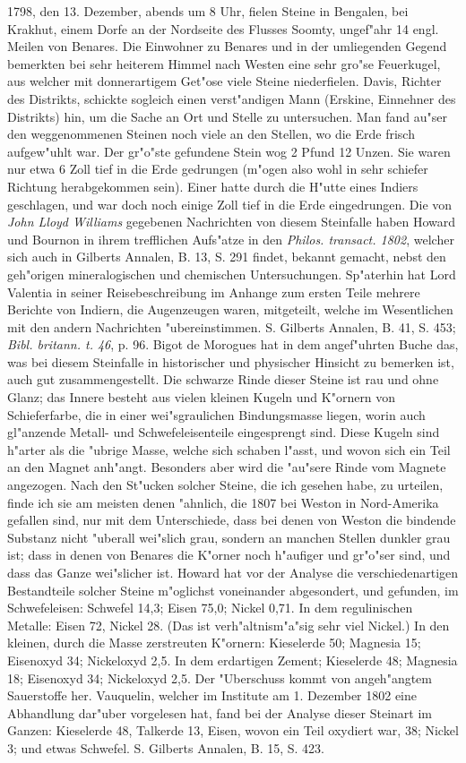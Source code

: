 \documentclass[a4paper, 11pt, oneside, polutonikogreek, german]{article}
\begin{document}
1798, den 13. Dezember, abends um 8 Uhr, fielen Steine in Bengalen, bei Krakhut, einem Dorfe an der Nordseite des Flusses Soomty, ungef"ahr 14 engl. Meilen von Benares. Die Einwohner zu Benares und in der umliegenden Gegend bemerkten bei sehr heiterem Himmel nach Westen eine sehr gro"se Feuerkugel, aus welcher mit donnerartigem Get"ose viele Steine niederfielen. Davis, Richter des Distrikts, schickte sogleich einen verst"andigen Mann (Erskine, Einnehner des Distrikts) hin, um die Sache an Ort und Stelle zu untersuchen. Man fand au"ser den weggenommenen Steinen noch viele an den Stellen, wo die Erde frisch aufgew"uhlt war. Der gr"o"ste gefundene Stein wog 2 Pfund 12 Unzen. Sie waren nur etwa 6 Zoll tief in die Erde gedrungen (m"ogen also wohl in sehr schiefer Richtung herabgekommen sein). Einer hatte durch die H"utte eines Indiers geschlagen, und war doch noch einige Zoll tief in die Erde eingedrungen. Die von \emph{John Lloyd Williams} gegebenen Nachrichten von diesem Steinfalle haben Howard und Bournon in ihrem trefflichen Aufs"atze in den \emph{Philos. transact. 1802}, welcher sich auch in Gilberts Annalen, B. 13, S. 291 findet, bekannt gemacht, nebst den geh"origen mineralogischen und chemischen Untersuchungen. Sp"aterhin hat Lord Valentia in seiner Reisebeschreibung im Anhange zum ersten Teile mehrere Berichte von Indiern, die Augenzeugen waren, mitgeteilt, welche im Wesentlichen mit den andern Nachrichten "ubereinstimmen. S. Gilberts Annalen, B. 41, S. 453; \emph{Bibl. britann. t. 46}, p. 96. Bigot de Morogues hat in dem angef"uhrten Buche das, was bei diesem Steinfalle in historischer und physischer Hinsicht zu bemerken ist, auch gut zusammengestellt. Die schwarze Rinde dieser Steine ist rau und ohne Glanz; das Innere besteht aus vielen kleinen Kugeln und K"ornern von Schieferfarbe, die in einer wei"sgraulichen Bindungsmasse liegen, worin auch gl"anzende Metall- und Schwefeleisenteile eingesprengt sind. Diese Kugeln sind h"arter als die "ubrige Masse, welche sich schaben l"asst, und wovon sich ein Teil an den Magnet anh"angt. Besonders aber wird die "au"sere Rinde vom Magnete angezogen. Nach den St"ucken solcher Steine, die ich gesehen habe, zu urteilen, finde ich sie am meisten denen "ahnlich, die 1807 bei Weston in Nord-Amerika gefallen sind, nur mit dem Unterschiede, dass bei denen von Weston die bindende Substanz nicht "uberall wei"slich grau, sondern an manchen Stellen dunkler grau ist; dass in denen von Benares die K"orner noch h"aufiger und gr"o"ser sind, und dass das Ganze wei"slicher ist. Howard hat vor der Analyse die verschiedenartigen Bestandteile solcher Steine m"oglichst voneinander abgesondert, und gefunden, im Schwefeleisen: Schwefel 14,3; Eisen 75,0; Nickel 0,71. In dem regulinischen Metalle: Eisen 72, Nickel 28. (Das ist verh"altnism"a"sig sehr viel Nickel.) In den kleinen, durch die Masse zerstreuten K"ornern: Kieselerde 50; Magnesia 15; Eisenoxyd 34; Nickeloxyd 2,5. In dem erdartigen Zement; Kieselerde 48; Magnesia 18; Eisenoxyd 34; Nickeloxyd 2,5. Der "Uberschuss kommt von angeh"angtem Sauerstoffe her. Vauquelin, welcher im Institute am 1. Dezember 1802 eine Abhandlung dar"uber vorgelesen hat, fand bei der Analyse dieser Steinart im Ganzen: Kieselerde 48, Talkerde 13, Eisen, wovon ein Teil oxydiert war, 38; Nickel 3; und etwas Schwefel. S. Gilberts Annalen, B. 15, S. 423.
\end{document}
